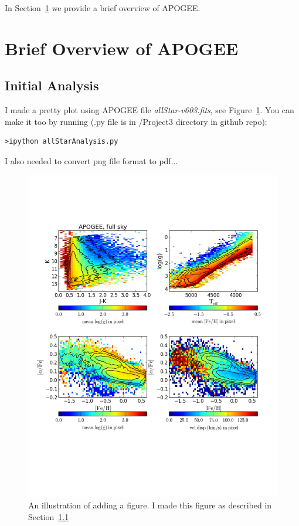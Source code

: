 \documentclass[12pt,preprint]{aastex}
\newcommand{\Fig}[1]{Figure~\ref{fig:#1}}
\newcommand{\fig}[1]{\Fig{#1}}
\newcommand{\figlabel}[1]{\label{fig:#1}}
\newcommand{\Sect}[1]{Section~\ref{sect:#1}}
\newcommand{\sect}[1]{\Sect{#1}}
\newcommand{\sectlabel}[1]{\label{sect:#1}}
\begin{document}
In \sect{brief_overview} we provide a brief overview of APOGEE.


\section{Brief Overview of APOGEE}
\sectlabel{brief_overview}

\subsection{Initial Analysis}
\sectlabel{initialAnalysis}

I made a pretty plot using APOGEE file {\it allStar-v603.fits}, see \fig{basic_example}. 
You can make it too by running (.py file is in /Project3 directory in github repo):

\begin{lstlisting}
>ipython allStarAnalysis.py
\end{lstlisting}

I also needed to convert png file format to pdf...

\begin{figure}
  \centering
  \includegraphics[width=\textwidth]{apogee1.pdf}
  \vskip -1.5in
  \caption{
    An illustration of adding a figure. I made this figure as described in \sect{initialAnalysis}
  }
  \figlabel{basic_example}
\end{figure}
\end{document}
